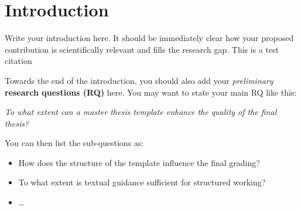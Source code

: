 \section{Introduction}
\label{sec:introduction}
Write your introduction here. It should be immediately clear how your proposed contribution is scientifically relevant and fills the research gap.
  This is a test citation \cite{Gruber1995}

Towards the end of the introduction, you should also add your \textit{preliminary} \textbf{research questions (RQ)} here. You may want to state your main RQ like this:

\noindent\textit{To what extent can a master thesis template enhance the quality of the final thesis?}

You can then list the sub-questions as:
\begin{itemize}
    \item How does the structure of the template influence the final grading?
    \item To what extent is textual guidance sufficient for structured working?
    \item \dots
\end{itemize}